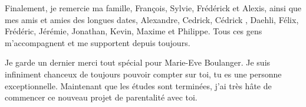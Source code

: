 Finalement,
je remercie ma famille, François, Sylvie, Frédérick et Alexis,
ainsi que mes amis et amies des longues dates, Alexandre, Cedrick, Cédrick , Daehli, Félix,
Frédéric, Jérémie, Jonathan, Kevin, Maxime et Philippe.
Tous ces gens m'accompagnent et me supportent depuis toujours.

Je garde un dernier merci tout spécial pour Marie-Eve Boulanger.
Je suis infiniment chanceux de toujours pouvoir compter sur toi,
tu es une personne exceptionnelle.
Maintenant que les études sont terminées,
j'ai très hâte de commencer ce nouveau projet de parentalité avec toi.

